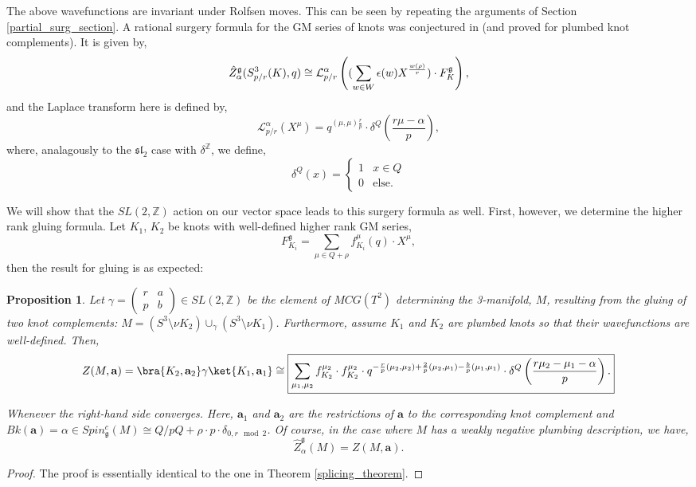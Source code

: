 \documentclass{article}
\def\be{\begin{equation}}
\def\ee{\end{equation}}
\newtheorem{proposition}{Proposition}[section]
\numberwithin{corollary}{theorem}
\numberwithin{corollary}{proposition}
\begin{document}
The above wavefunctions are invariant under Rolfsen moves. This can be seen by repeating the arguments of Section \ref{partial_surg_section}. A rational surgery formula for the GM series of knots was conjectured in \cite{P3} (and proved for plumbed knot complements). It is given by, 
$$\Hat{Z}^\mathfrak{g}_\alpha (S^3_{p/r}(K),q) \cong \mathcal{L}^\alpha_{p/r}\left((\sum_{w\in W}\epsilon(w)X^{\frac{w(\rho)}{r}})\cdot F^\mathfrak{g}_K\right),$$
and the Laplace transform here is defined by,
$$\mathcal{L}^\alpha_{p/r} (X^\mu) = q^{(\mu,\mu)\frac{r}{p}} \cdot \delta^Q\left(\frac{r\mu-\alpha}{p}\right),$$
where, analagously to the $\mathfrak{sl_2}$ case with $\delta^\mathbb{Z}$, we define,
$$\delta^Q(x) = \begin{cases}
    1 &x\in Q\\
    0 & \text{else.}
\end{cases} $$

We will show that the $SL(2,\mathbb{Z})$ action on our vector space leads to this surgery formula as well. First, however, we determine the higher rank gluing formula. Let $K_1$, $K_2$ be knots with well-defined higher rank GM series,
$$F^\mathfrak{g}_{K_i} = \sum_{\mu\in Q+\rho} f^\mu_{K_i}(q) \cdot X^\mu,$$
then the result for gluing is as expected:
\begin{proposition}
    Let $\gamma = \begin{pmatrix}
        r&a\\ p&b
    \end{pmatrix} \in SL(2,\mathbb{Z})$ be the element of $MCG(T^2)$ determining the 3-manifold, $M$, resulting from the gluing of two knot complements: $M = (S^3 \setminus\nu K_2)\cup_\gamma (S^3 \setminus\nu K_1)$. Furthermore, assume $K_1$ and $K_2$ are plumbed knots so that their wavefunctions are well-defined. Then,
    \be \label{higher_rank_splicing_eq} Z(M,\mathbf{a}) = \bra{K_2,\mathbf{a}_2}\gamma\ket{K_1,\mathbf{a}_1} \cong \boxed{ \sum_{\mu_1,\mu_2}f^{\mu_2}_{K_2}\cdot f^{\mu_2}_{K_2} \cdot q^{-\frac{r}{p} (\mu_2,\mu_2) + \frac{2}{p}(\mu_2,\mu_1) -\frac{b}{p} (\mu_1,\mu_1)} \cdot \delta^Q\left( \frac{r \mu_2 -\mu_1 - \alpha}{p}\right).} \ee

    Whenever the right-hand side converges. Here, $\mathbf{a}_1$ and $\mathbf{a}_2$ are the restrictions of $\mathbf{a}$ to the corresponding knot complement and $Bk(\mathbf{a}) = \alpha \in Spin^c_\mathfrak{g}(M) \cong Q/pQ + \rho \cdot p\cdot \delta_{0,r\mod 2}$. Of course, in the case where $M$ has a weakly negative plumbing description, we have,
$$\hat{Z}^\mathfrak{g}_{\alpha}(M) = Z(M,\mathbf{a}) .$$
\end{proposition}
\begin{proof}
    The proof is essentially identical to the one in Theorem \ref{splicing_theorem}.
\end{proof}
\end{document}
